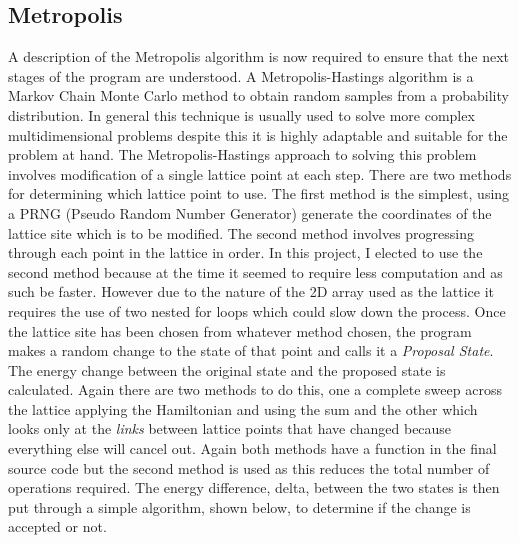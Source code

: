 \subsection{Metropolis}
A description of the Metropolis algorithm is now required to ensure that the next stages of the program are understood.
A Metropolis-Hastings algorithm is a Markov Chain Monte Carlo method to obtain random samples from a probability distribution.
In general this technique is usually used to solve more complex multidimensional problems despite this it is highly adaptable and suitable for the problem at hand.
The Metropolis-Hastings approach to solving this problem involves modification of a single lattice point at each step.
There are two methods for determining which lattice point to use.
The first method is the simplest, using a PRNG (Pseudo Random Number Generator) generate the coordinates of the lattice site which is to be modified.
The second method involves progressing through each point in the lattice in order.
In this project, I elected to use the second method because at the time it seemed to require less computation and as such be faster.
However due to the nature of the 2D array used as the lattice it requires the use of two nested for loops which could slow down the process.
Once the lattice site has been chosen from whatever method chosen, the program makes a random change to the state of that point and calls it a \textit{Proposal State}.
The energy change between the original state and the proposed state is calculated.
Again there are two methods to do this, one a complete sweep across the lattice applying the Hamiltonian and using the sum and the other which looks only at the \textit{links} between lattice points that have changed because everything else will cancel out.
Again both methods have a function in the final source code but the second method is used as this reduces the total number of operations required.
The energy difference, delta, between the two states is then put through a simple algorithm, shown below, to determine if the change is accepted or not.

